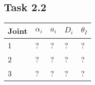 \subsection*{Task 2.2}
\begin{center}
	\begin{tabular}{ | l | l | l | l | l |}
		\hline
		Joint & $\alpha_{i}$ & $a_{i}$ & $D_i$ & $\theta_I$ \\ \hline
		1 & ? & ? & ? & ?\\ \hline
		2 & ? & ? & ? & ?\\ \hline
		3 & ? & ? & ? & ?\\ \hline
	\end{tabular}
\end{center}